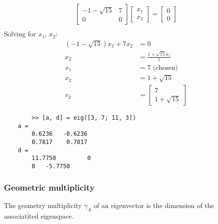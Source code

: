 \begin{example}
    \begin{align*}
        \begin{bmatrix}
            -1  - \sqrt{15} & 7 \\
            0               & 0
        \end{bmatrix} \begin{bmatrix}
            x_1 \\ x_2
        \end{bmatrix} = \begin{bmatrix}
            0 \\ 0
        \end{bmatrix} \\
    \end{align*}
    Solving for $x_1$, $x_2$:
    \begin{align*}
        (-1-\sqrt{15}) x_1 + 7 x_2 & = 0                           \\
        x_2                        & = \frac{1 + \sqrt{15}x_1}{7}  \\
        x_1                        & = 7  \text{ (chosen)}         \\
        x_2                        & = 1 + \sqrt{15}               \\
        v_2                        & = \begin{bmatrix}
            7 \\ 1 + \sqrt{15}
        \end{bmatrix}
    \end{align*}
\end{example}
\begin{matlab}
    \begin{lstlisting}
        >> [a, d] = eig([3, 7; 11, 3])
    a =
        0.6236   -0.6236
        0.7817    0.7817
    d =
        11.7750         0
        0   -5.7750
    \end{lstlisting}
\end{matlab}
\subsubsection{Geometric multiplicity}
The geometry multiplicity \(\gamma_A \) of an eigenvector is the dimension of the associatited eigenspace.


